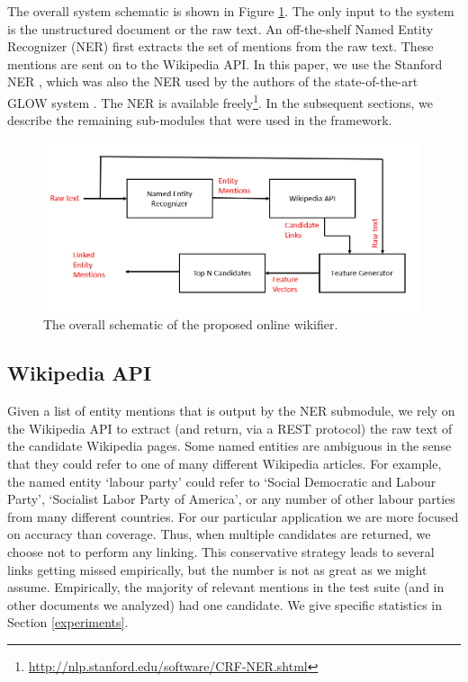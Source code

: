 
The overall system schematic is shown in Figure \ref{fig0}. The only input to the system is the unstructured document or the raw text. An off-the-shelf Named Entity Recognizer (NER) first extracts the set of mentions from the raw text. These mentions are sent on to the Wikipedia API. In this paper, we use the Stanford NER \cite{stanford}, which was also the NER used by the authors of the state-of-the-art GLOW system \cite{roth}. The NER is available freely\footnote{\url{http://nlp.stanford.edu/software/CRF-NER.shtml}}. In the subsequent sections, we describe the remaining sub-modules that were used in the framework. 

\begin{figure}
\centering
\includegraphics[height=5cm, width=12.5cm]{schematic}
\caption{The overall schematic of the proposed online wikifier.}
\label{fig0}
\end{figure}

\subsection{Wikipedia API}
Given a list of entity mentions that is output by the NER submodule, we rely on the 
Wikipedia API to extract (and return, via a REST protocol) the raw text of the candidate Wikipedia pages. Some 
named entities are ambiguous in the sense that they could refer to one of many different
Wikipedia articles. For example, the named entity `labour party' could refer to
`Social Democratic and Labour Party',
`Socialist Labor Party of America', or any number of other labour parties from many
different countries. For our particular application we are more focused on accuracy 
than coverage. Thus, when multiple candidates are returned,
we choose not to perform any linking. This conservative strategy leads to several links getting missed empirically, but the number is not as great as we might assume. Empirically, the majority of relevant mentions in the test suite (and in other documents we analyzed) had one candidate. We give specific statistics in Section \ref{experiments}. 

